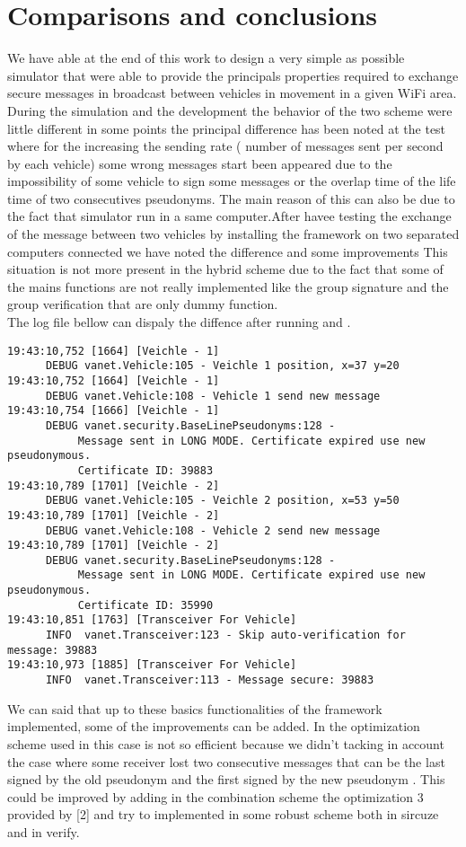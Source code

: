 \section{Comparisons and conclusions}
We have able at the end of this work to design a very simple as possible simulator that were able to provide the principals properties required to exchange secure messages in broadcast between vehicles in movement in a given WiFi area.    
During the simulation and the development the behavior of the two scheme were little different in some points the principal difference has been noted at the test where for the \baseline increasing the sending rate ( number of messages sent per  second by each vehicle) some wrong messages start been appeared due to the impossibility of some vehicle to sign some messages or the overlap time of the life time of two consecutives pseudonyms. The main reason of this can also be due to the fact that simulator run in a same computer.After havee testing the exchange of the message between two vehicles by installing the framework on two separated computers connected we have noted the difference and some improvements
This situation is not more present in the hybrid scheme due to the fact that some of the mains functions are not really implemented like the group signature and the group verification that are only dummy function.\\

The log file bellow can dispaly the diffence after running \baseline and \hybrid.
\begin{verbatim}
19:43:10,752 [1664] [Veichle - 1] 
      DEBUG vanet.Vehicle:105 - Veichle 1 position, x=37 y=20
19:43:10,752 [1664] [Veichle - 1] 
      DEBUG vanet.Vehicle:108 - Vehicle 1 send new message
19:43:10,754 [1666] [Veichle - 1] 
      DEBUG vanet.security.BaseLinePseudonyms:128 - 
           Message sent in LONG MODE. Certificate expired use new pseudonymous. 
           Certificate ID: 39883
19:43:10,789 [1701] [Veichle - 2] 
      DEBUG vanet.Vehicle:105 - Veichle 2 position, x=53 y=50
19:43:10,789 [1701] [Veichle - 2] 
      DEBUG vanet.Vehicle:108 - Vehicle 2 send new message
19:43:10,789 [1701] [Veichle - 2] 
      DEBUG vanet.security.BaseLinePseudonyms:128 - 
           Message sent in LONG MODE. Certificate expired use new pseudonymous. 
           Certificate ID: 35990
19:43:10,851 [1763] [Transceiver For Vehicle] 
      INFO  vanet.Transceiver:123 - Skip auto-verification for message: 39883
19:43:10,973 [1885] [Transceiver For Vehicle] 
      INFO  vanet.Transceiver:113 - Message secure: 39883
\end{verbatim}

We can said that up to these basics functionalities of the framework implemented, some of the improvements can be added.  In the optimization scheme used in this case is not so efficient because we didn't tacking in account the case where some receiver lost two consecutive messages that can be the last signed by the old pseudonym and the first signed by the  new pseudonym . This could be improved by adding in the combination scheme the optimization 3 provided by [2] and try to implemented in some robust scheme both in sircuze and in verify.\\
